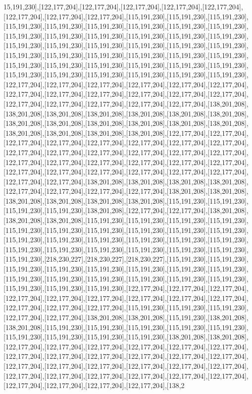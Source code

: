 15,191,230],[122,177,204],[122,177,204],[122,177,204],[122,177,204],[122,177,204],[122,177,204],[122,177,204],[122,177,204],[115,191,230],[115,191,230],[115,191,230],[115,191,230],[115,191,230],[115,191,230],[115,191,230],[115,191,230],[115,191,230],[115,191,230],[115,191,230],[115,191,230],[115,191,230],[115,191,230],[115,191,230],[115,191,230],[115,191,230],[115,191,230],[115,191,230],[115,191,230],[115,191,230],[115,191,230],[115,191,230],[115,191,230],[115,191,230],[115,191,230],[115,191,230],[115,191,230],[115,191,230],[115,191,230],[115,191,230],[115,191,230],[115,191,230],[115,191,230],[115,191,230],[115,191,230],[115,191,230],[115,191,230],[115,191,230],[122,177,204],[122,177,204],[122,177,204],[122,177,204],[122,177,204],[122,177,204],[122,177,204],[122,177,204],[122,177,204],[122,177,204],[122,177,204],[122,177,204],[122,177,204],[122,177,204],[122,177,204],[122,177,204],[122,177,204],[138,201,208],[138,201,208],[138,201,208],[138,201,208],[138,201,208],[138,201,208],[138,201,208],[138,201,208],[138,201,208],[138,201,208],[138,201,208],[138,201,208],[138,201,208],[138,201,208],[138,201,208],[138,201,208],[138,201,208],[122,177,204],[122,177,204],[122,177,204],[122,177,204],[122,177,204],[122,177,204],[122,177,204],[122,177,204],[122,177,204],[122,177,204],[122,177,204],[122,177,204],[122,177,204],[122,177,204],[122,177,204],[122,177,204],[122,177,204],[122,177,204],[122,177,204],[122,177,204],[122,177,204],[122,177,204],[122,177,204],[122,177,204],[122,177,204],[122,177,204],[122,177,204],[122,177,204],[138,201,208],[138,201,208],[138,201,208],[138,201,208],[122,177,204],[122,177,204],[122,177,204],[122,177,204],[138,201,208],[138,201,208],[138,201,208],[138,201,208],[138,201,208],[138,201,208],[115,191,230],[115,191,230],[115,191,230],[115,191,230],[138,201,208],[122,177,204],[122,177,204],[138,201,208],[138,201,208],[138,201,208],[115,191,230],[115,191,230],[115,191,230],[115,191,230],[115,191,230],[115,191,230],[115,191,230],[115,191,230],[115,191,230],[115,191,230],[115,191,230],[115,191,230],[115,191,230],[115,191,230],[115,191,230],[115,191,230],[115,191,230],[115,191,230],[115,191,230],[115,191,230],[115,191,230],[115,191,230],[115,191,230],[218,230,227],[218,230,227],[218,230,227],[115,191,230],[115,191,230],[115,191,230],[115,191,230],[115,191,230],[115,191,230],[115,191,230],[115,191,230],[115,191,230],[115,191,230],[115,191,230],[115,191,230],[115,191,230],[115,191,230],[115,191,230],[115,191,230],[115,191,230],[122,177,204],[122,177,204],[122,177,204],[122,177,204],[122,177,204],[122,177,204],[122,177,204],[122,177,204],[122,177,204],[122,177,204],[122,177,204],[122,177,204],[115,191,230],[115,191,230],[115,191,230],[122,177,204],[122,177,204],[138,201,208],[138,201,208],[115,191,230],[138,201,208],[138,201,208],[115,191,230],[115,191,230],[115,191,230],[115,191,230],[115,191,230],[115,191,230],[115,191,230],[115,191,230],[115,191,230],[138,201,208],[138,201,208],[122,177,204],[122,177,204],[122,177,204],[122,177,204],[122,177,204],[122,177,204],[122,177,204],[122,177,204],[122,177,204],[122,177,204],[122,177,204],[122,177,204],[122,177,204],[122,177,204],[122,177,204],[122,177,204],[122,177,204],[122,177,204],[122,177,204],[122,177,204],[122,177,204],[122,177,204],[122,177,204],[122,177,204],[122,177,204],[122,177,204],[122,177,204],[122,177,204],[138,2